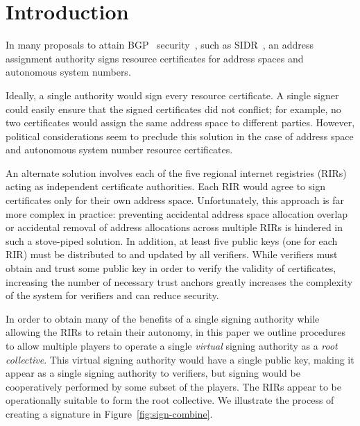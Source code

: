 \section{Introduction}
\label{sec:intro}

In many proposals to attain BGP~\cite{bgp}
security~\cite{s-bgp1,s-bgp2,sobgp,psbgp,spv}, such as
SIDR~\cite{sidr-arch}, an address assignment authority signs resource
certificates for address spaces and autonomous system
numbers.

Ideally, a single authority would sign every resource certificate. A
single signer could easily ensure that the signed certificates did not
conflict; for example, no two certificates would assign the same
address space to different parties. However, political considerations
seem to preclude this solution in the case of
address space and autonomous system number resource certificates.

An alternate solution involves each of the five regional internet
registries (RIRs) acting as independent certificate authorities. Each
RIR would agree to sign certificates only for their own address
space. Unfortunately, this approach is far more complex in practice:
preventing accidental address space allocation overlap or accidental
removal of address allocations across multiple RIRs is hindered in
such a stove-piped solution.  In addition, at least five public keys
(one for each RIR) must be distributed to and updated by all
verifiers. While verifiers must obtain and trust some public key in
order to verify the validity of certificates, increasing the number of
necessary trust anchors greatly increases the complexity of the system
for verifiers and can reduce security.

In order to obtain many of the benefits of a single signing authority
while allowing the RIRs to retain their autonomy, in this paper we
outline procedures to allow multiple players to operate a single {\it
virtual} signing authority as a {\it root collective}. This virtual
signing authority would have a single public key, making it appear as
a single signing authority to verifiers, but signing would be
cooperatively performed by some subset of the players. The RIRs appear
to be operationally suitable to form the root collective. We
illustrate the process of creating a signature in
Figure~\ref{fig:sign-combine}.


